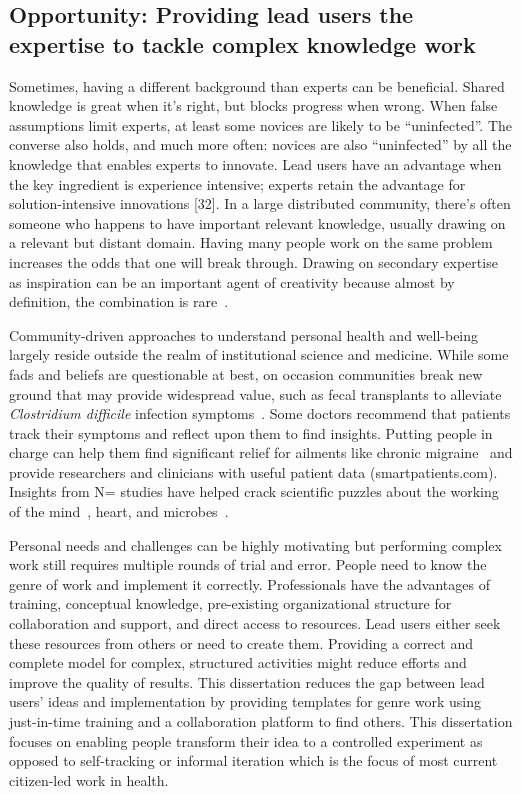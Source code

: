 \subsection{Opportunity: Providing lead users the expertise to tackle complex knowledge work}
Sometimes, having a different background
 than experts can be beneficial. Shared knowledge is great when it’s right, but blocks progress
 when wrong. When false assumptions limit experts, at least some novices are likely to be 
“uninfected”. The converse also holds, and much more often: novices are also “uninfected” 
by all the knowledge that enables experts to innovate. Lead users have an advantage when the key ingredient is experience intensive; experts retain the
advantage for solution-intensive innovations [32]. In a large distributed community, 
there’s often someone who happens to have important relevant knowledge, usually 
drawing on a relevant but distant domain. Having many people work on the same problem 
increases the odds that one will break through. Drawing on secondary expertise as 
inspiration can be an important agent of creativity because almost by definition, the
 combination is rare~\cite{Boden2004}. 

Community-driven approaches to understand personal
health and well-being largely reside outside the realm
of institutional science and medicine. While some fads and beliefs are 
questionable at best, on occasion communities
break new ground that may provide widespread value,
such as fecal transplants to alleviate \textit{Clostridium difficile} infection
symptoms~\cite{Brandt2012}. Some doctors recommend that patients
track their symptoms and reflect upon them to find
insights. Putting people in charge can help them find significant
relief for ailments like chronic migraine~\cite{Gawande2017} and provide
researchers and clinicians with useful patient data
(smartpatients.com). Insights from N\Hair= studies have helped
crack scientific puzzles about the working of the mind~\cite{V.S.Ramachandran1998},
heart, and microbes~\cite{Weisse2012}. 

Personal needs and challenges can be highly motivating but performing complex work still requires multiple rounds of trial and error. 
People need to know the genre of work and implement it correctly.  Professionals have the advantages of training, conceptual knowledge, 
pre-existing organizational structure for 
collaboration and support, and direct access to resources. Lead users either seek these resources from others or need to create them. 
Providing a correct and complete model for complex, structured activities might reduce efforts and improve the quality of results.
This dissertation reduces the gap between lead users' ideas and implementation by providing templates for 
genre work using just-in-time training and a collaboration platform to find others. This dissertation focuses on enabling people transform their idea to a controlled experiment as opposed to 
self-tracking or informal iteration which is the focus of most current citizen-led work in health.

